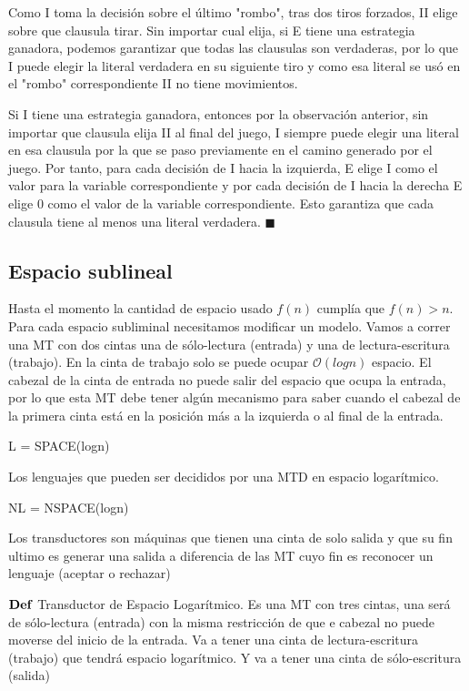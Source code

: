 \documentclass{homework}
\begin{document}
Como I toma la decisión sobre el último "rombo", tras dos tiros forzados, II elige sobre que clausula tirar. Sin importar cual elija, si E tiene una estrategia ganadora, podemos garantizar que todas las clausulas son verdaderas, por lo que I puede elegir la literal verdadera en su siguiente tiro y como esa literal se usó en el "rombo" correspondiente II no tiene movimientos.

Si I tiene una estrategia ganadora, entonces por la observación anterior, sin importar que clausula elija II al final del juego, I siempre puede elegir una literal en esa clausula por la que se paso previamente en el camino generado por el juego. Por tanto, para cada decisión de I hacia la izquierda, E elige I como el valor para la variable correspondiente y por cada decisión de I hacia la derecha E elige 0 como el valor de la variable correspondiente. Esto garantiza que cada clausula tiene al menos una literal verdadera. $\blacksquare$ 


\subsection{Espacio sublineal}

Hasta el momento la cantidad de espacio usado $f(n)$ cumplía que $f(n) > n$. Para cada espacio subliminal necesitamos modificar un modelo. Vamos a correr una MT con dos cintas una de sólo-lectura (entrada) y una de lectura-escritura (trabajo). En la cinta de trabajo solo se puede ocupar $\mathcal{O}(logn)$ espacio. El cabezal de la cinta de entrada no puede salir del espacio que ocupa la entrada, por lo que esta MT debe tener algún mecanismo para saber cuando el cabezal de la primera cinta está en la posición más a la izquierda o al final de la entrada.

L = SPACE(logn)

Los lenguajes que pueden ser decididos por una MTD en espacio logarítmico.

NL = NSPACE(logn)

Los transductores son máquinas que tienen una cinta de solo salida y que su fin ultimo es generar una salida a diferencia de las MT cuyo fin es reconocer un lenguaje (aceptar o rechazar)

$\bf{Def}$ Transductor de Espacio Logarítmico.
Es una MT con tres cintas, una será de sólo-lectura (entrada) con la misma restricción de que e cabezal no puede moverse del inicio de la entrada.
Va a tener una cinta de lectura-escritura (trabajo) que tendrá espacio logarítmico.
Y va a tener una cinta de sólo-escritura (salida)
\end{document}

